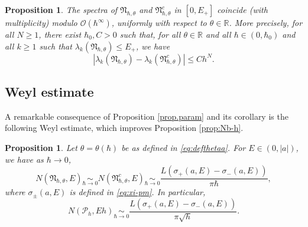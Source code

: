 \documentclass[JEP,XML,SOM,Unicode,NoFloatCountersInSection,published]{cedram}
\newcommand{\cP}{\mathcal{P}}
\theoremstyle{plain}
\newtheorem{proposition}[theorem]{Proposition}
\theoremstyle{definition}
\begin{document}
\begin{proposition}\label{prop.coincide}
The spectra of $\mathfrak{N}_{\hbar,\theta}$ and $\mathfrak{N}^c_{\hbar,\theta}$ in $[0,E_+]$ coincide (with multiplicity) modulo $\mathscr{O}(\hbar^\infty)$, uniformly with respect to $\theta\in\mathbb{R}$. More precisely, for all $N\geq 1$, there exist $\hbar_0, C>0$ such that, for all $\theta\in\mathbb{R}$ and all $\hbar\in(0,\hbar_0)$ and all $k\geq 1$ such that $\lambda_k(\mathfrak{N}_{\hbar,\theta})\leq E_+$, we have
\[
|\lambda_k(\mathfrak{N}_{\hbar,\theta})-\lambda_k(\mathfrak{N}^c_{\hbar,\theta})|\leq Ch^N.
\]
\end{proposition}

\subsection{Weyl estimate}
A remarkable consequence of Proposition \ref{prop.param} and its corollary is the following Weyl estimate, which improves Proposition \ref{prop:Nb-h}.
\begin{proposition}\label{cor.Weyl}
Let $\theta=\theta(\hbar)$ be as defined in \eqref{eq:defthetaa}. For $E\in(0,|a|)$, we have as $\hbar\to0$,
\[
N(\mathfrak{N}_{\hbar,\theta},E)\underset{\hbar\to 0}\sim N(\mathfrak{N}^c_{\hbar,\theta},E)\underset{\hbar\to 0}\sim \frac{L(\sigma_+(a,E)-\sigma_-(a,E))}{\pi\hbar},
\]
where $\sigma_\pm(a,E)$ is defined in \eqref{eq:xi-pm}.
In particular,
\[
N(\cP_h, Eh)\underset{\hbar\to 0}\sim \frac{L(\sigma_+(a,E)-\sigma_-(a,E))}{\pi\sqrt{h}}.
\]
\end{proposition}
\end{document}

